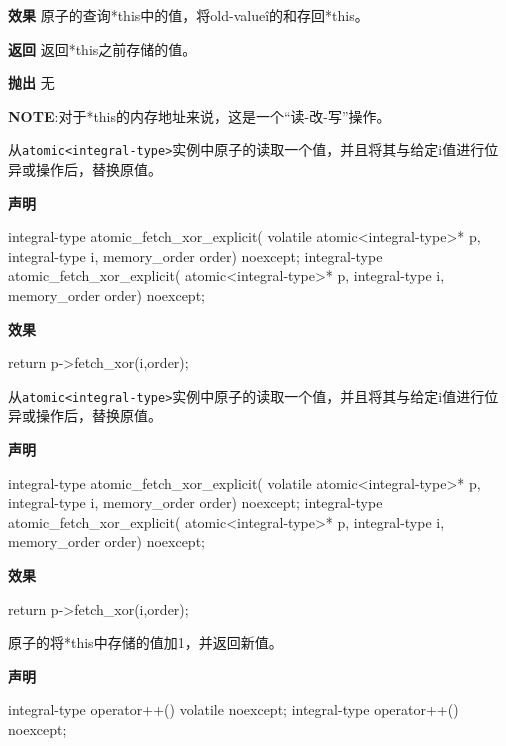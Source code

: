 \textbf{效果}
原子的查询*this中的值，将old-value\^i的和存回*this。

\textbf{返回}
返回*this之前存储的值。

\textbf{抛出}
无

\textbf{NOTE}:对于*this的内存地址来说，这是一个“读-改-写”操作。


从\texttt{atomic<integral-type>}实例中原子的读取一个值，并且将其与给定i值进行位异或操作后，替换原值。

\textbf{声明}

\begin{cpp}
integral-type atomic_fetch_xor_explicit(
    volatile atomic<integral-type>* p, integral-type i,
    memory_order order) noexcept;
integral-type atomic_fetch_xor_explicit(
    atomic<integral-type>* p, integral-type i, memory_order order)
    noexcept;
\end{cpp}

\textbf{效果}

\begin{cpp}
return p->fetch_xor(i,order);
\end{cpp}


从\texttt{atomic<integral-type>}实例中原子的读取一个值，并且将其与给定i值进行位异或操作后，替换原值。

\textbf{声明}

\begin{cpp}
integral-type atomic_fetch_xor_explicit(
    volatile atomic<integral-type>* p, integral-type i,
    memory_order order) noexcept;
integral-type atomic_fetch_xor_explicit(
    atomic<integral-type>* p, integral-type i, memory_order order)
    noexcept;
\end{cpp}

\textbf{效果}

\begin{cpp}
return p->fetch_xor(i,order);
\end{cpp}


原子的将*this中存储的值加1，并返回新值。

\textbf{声明}

\begin{cpp}
integral-type operator++() volatile noexcept;
integral-type operator++() noexcept;
\end{cpp}

